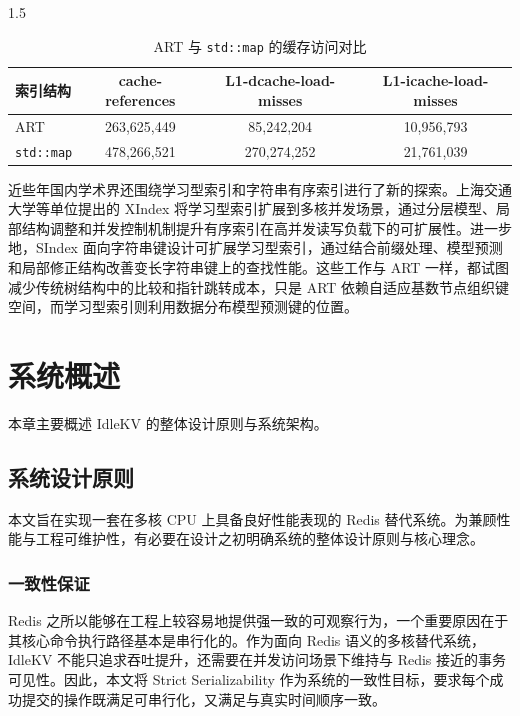 \documentclass[a4paper,12pt,fontset=none,twoside]{article}
\numberwithin{figure}{section}
\numberwithin{equation}{section}
\numberwithin{table}{section}
\begin{document}
\begin{spacing}{1.5}
\begin{table}[htbp]
	\centering
	\small
	\caption{ART 与 \texttt{std::map} 的缓存访问对比}
	\label{tab:art-map-cache}
	\begin{tabular}{lccc}
		\toprule
		索引结构 & cache-references & L1-dcache-load-misses & L1-icache-load-misses \\
		\midrule
		ART & 263,625,449 & 85,242,204 & 10,956,793 \\
		\texttt{std::map} & 478,266,521 & 270,274,252 & 21,761,039 \\
		\bottomrule
	\end{tabular}
\end{table}

	近些年国内学术界还围绕学习型索引和字符串有序索引进行了新的探索。上海交通大学等单位提出的 XIndex\cite{XIndex} 将学习型索引扩展到多核并发场景，通过分层模型、局部结构调整和并发控制机制提升有序索引在高并发读写负载下的可扩展性。进一步地，SIndex\cite{SIndex} 面向字符串键设计可扩展学习型索引，通过结合前缀处理、模型预测和局部修正结构改善变长字符串键上的查找性能。这些工作与 ART 一样，都试图减少传统树结构中的比较和指针跳转成本，只是 ART 依赖自适应基数节点组织键空间，而学习型索引则利用数据分布模型预测键的位置。

	
	\section{系统概述}
	本章主要概述 IdleKV 的整体设计原则与系统架构。

	\subsection{系统设计原则}

	本文旨在实现一套在多核 CPU 上具备良好性能表现的 Redis 替代系统。为兼顾性能与工程可维护性，有必要在设计之初明确系统的整体设计原则与核心理念。

	\subsubsection{一致性保证}

	Redis 之所以能够在工程上较容易地提供强一致的可观察行为，一个重要原因在于其核心命令执行路径基本是串行化的。作为面向 Redis 语义的多核替代系统，IdleKV 不能只追求吞吐提升，还需要在并发访问场景下维持与 Redis 接近的事务可见性。因此，本文将 Strict Serializability 作为系统的一致性目标\cite{Linearizability:a-correctness-condition-for-concurrent-objects}，要求每个成功提交的操作既满足可串行化，又满足与真实时间顺序一致。


\end{spacing}
\end{document}
